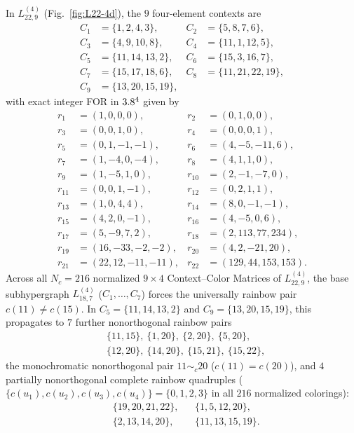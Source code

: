 \documentclass[aps,pra,reprint,superscriptaddress,longbibliography,nofootinbib,floatfix,10pt]{revtex4-2}
\theoremstyle{definition}\newtheorem{definition}[theorem]{Definition}
\theoremstyle{remark}\newtheorem{remark}[theorem]{Remark}
\begin{document}
In $L_{22,9}^{(4)}$ (Fig.~\ref{fig:L22-4d}), the $9$ four-element contexts are
\begin{equation}\label{eq:L22-contexts}
\begin{aligned}
C_1&=\{1,2,4,3\},& C_2&=\{5,8,7,6\},\\
C_3&=\{4,9,10,8\},& C_4&=\{11,1,12,5\},\\
C_5&=\{11,14,13,2\},& C_6&=\{15,3,16,7\},\\
C_7&=\{15,17,18,6\},& C_8&=\{11,21,22,19\},\\
C_9&=\{13,20,15,19\},&&
\end{aligned}
\end{equation}
with exact integer FOR in $3.8^4$ given by
\begin{equation}\label{eq:L22-vectors}
\begin{aligned}
r_1&=(1,0,0,0),& r_2&=(0,1,0,0),\\
r_3&=(0,0,1,0),& r_4&=(0,0,0,1),\\
r_5&=(0,1,-1,-1),& r_6&=(4,-5,-11,6),\\
r_7&=(1,-4,0,-4),& r_8&=(4,1,1,0),\\
r_9&=(1,-5,1,0),& r_{10}&=(2,-1,-7,0),\\
r_{11}&=(0,0,1,-1),& r_{12}&=(0,2,1,1),\\
r_{13}&=(1,0,4,4),& r_{14}&=(8,0,-1,-1),\\
r_{15}&=(4,2,0,-1),& r_{16}&=(4,-5,0,6),\\
r_{17}&=(5,-9,7,2),& r_{18}&=(2,113,77,234),\\
r_{19}&=(16,-33,-2,-2),& r_{20}&=(4,2,-21,20),\\
r_{21}&=(22,12,-11,-11),& r_{22}&=(129,44,153,153).
\end{aligned}
\end{equation}
Across all $N_c=216$ normalized $9\times 4$ Context--Color Matrices of $L_{22,9}^{(4)}$, the base subhypergraph $L_{18,7}^{(4)}$ ($C_1,\ldots,C_7$) forces the universally rainbow pair $c(11)\neq c(15)$. In $C_5=\{11,14,13,2\}$ and $C_9=\{13,20,15,19\}$, this propagates to $7$ further nonorthogonal rainbow pairs
\begin{equation}\label{eq:L22-rainbow-pairs}
\begin{aligned}
&\{11,15\},\ \{1,20\},\ \{2,20\},\ \{5,20\},\\
&\{12,20\},\ \{14,20\},\ \{15,21\},\ \{15,22\},
\end{aligned}
\end{equation}
the monochromatic nonorthogonal pair $11\sim_c 20$ ($c(11)=c(20)$), and $4$ partially nonorthogonal complete rainbow quadruples ($\{c(u_1),c(u_2),c(u_3),c(u_4)\}=\{0,1,2,3\}$ in all $216$ normalized colorings):
\begin{equation}\label{eq:L22-complete4}
\begin{aligned}
&\{19,20,21,22\},& &\{1,5,12,20\},\\
&\{2,13,14,20\},& &\{11,13,15,19\}.
\end{aligned}
\end{equation}
\end{document}
